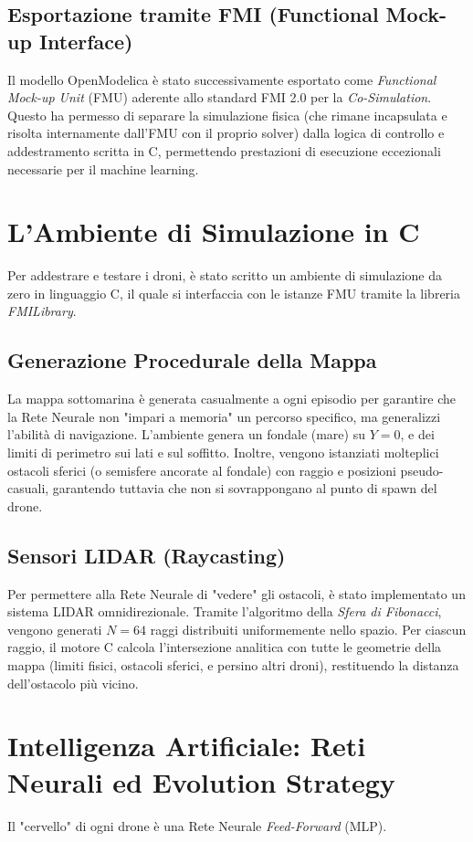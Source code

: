 ﻿\documentclass[12pt,a4paper]{article}
\begin{document}
\subsection{Esportazione tramite FMI (Functional Mock-up Interface)}
Il modello OpenModelica è stato successivamente esportato come \textit{Functional Mock-up Unit} (FMU) aderente allo standard FMI 2.0 per la \textit{Co-Simulation}. Questo ha permesso di separare la simulazione fisica (che rimane incapsulata e risolta internamente dall'FMU con il proprio solver) dalla logica di controllo e addestramento scritta in C, permettendo prestazioni di esecuzione eccezionali necessarie per il machine learning.

\section{L'Ambiente di Simulazione in C}
Per addestrare e testare i droni, è stato scritto un ambiente di simulazione da zero in linguaggio C, il quale si interfaccia con le istanze FMU tramite la libreria \textit{FMILibrary}.

\subsection{Generazione Procedurale della Mappa}
La mappa sottomarina è generata casualmente a ogni episodio per garantire che la Rete Neurale non "impari a memoria" un percorso specifico, ma generalizzi l'abilità di navigazione.
L'ambiente genera un fondale (mare) su $Y=0$, e dei limiti di perimetro sui lati e sul soffitto. Inoltre, vengono istanziati molteplici ostacoli sferici (o semisfere ancorate al fondale) con raggio e posizioni pseudo-casuali, garantendo tuttavia che non si sovrappongano al punto di spawn del drone.

\subsection{Sensori LIDAR (Raycasting)}
Per permettere alla Rete Neurale di "vedere" gli ostacoli, è stato implementato un sistema LIDAR omnidirezionale. Tramite l'algoritmo della \textit{Sfera di Fibonacci}, vengono generati $N = 64$ raggi distribuiti uniformemente nello spazio. Per ciascun raggio, il motore C calcola l'intersezione analitica con tutte le geometrie della mappa (limiti fisici, ostacoli sferici, e persino altri droni), restituendo la distanza dell'ostacolo più vicino.

\section{Intelligenza Artificiale: Reti Neurali ed Evolution Strategy}
Il "cervello" di ogni drone è una Rete Neurale \textit{Feed-Forward} (MLP).
\end{document}

